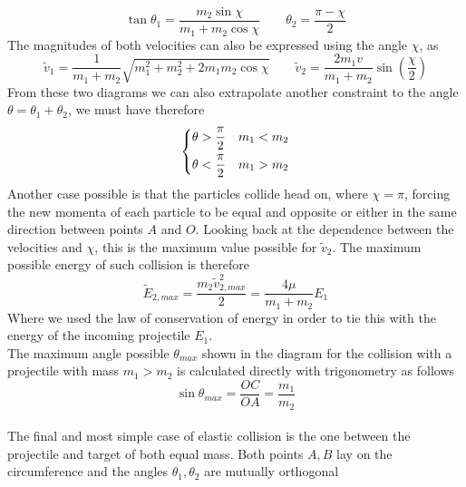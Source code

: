 \documentclass[../admech.tex]{subfiles}
\begin{document}
\begin{equation}
	\tan\theta_1=\frac{m_2\sin\chi}{m_1+m_2\cos\chi}\qquad\theta_2=\frac{\pi-\chi}{2}
	\label{eq:ecol12chi}
\end{equation}
The magnitudes of both velocities can also be expressed using the angle $\chi$, as
\begin{equation}
	\tilde{v}_1=\frac{1}{m_1+m_2}\sqrt{m_1^2+m_2^2+2m_1m_2\cos\chi}\qquad\tilde{v}_2=\frac{2m_1v}{m_1+m_2}\sin\left( \frac{\chi}{2} \right)
	\label{eq:ecolv12chi}
\end{equation}
From these two diagrams we can also extrapolate another constraint to the angle $\theta=\theta_1+\theta_2$, we must have therefore
\begin{equation}
	\begin{dcases}
		\theta>\frac{\pi}{2}&m_1<m_2\\
		\theta<\frac{\pi}{2}&m_1>m_2\\
	\end{dcases}
	\label{eq:thetaecol}
\end{equation}
Another case possible is that the particles collide head on, where $\chi=\pi$, forcing the new momenta of each particle to be equal and opposite or either in the same direction between points $A$ and $O$. Looking back at the dependence between the velocities and $\chi$, this is the maximum value possible for $\tilde{v}_2$. The maximum possible energy of such collision is therefore
\begin{equation}
	\tilde{E}_{2,max}=\frac{m_2\tilde{v}_{2,max}^2}{2}=\frac{4\mu}{m_1+m_2}E_1
	\label{eq:ecolE2max}
\end{equation}
Where we used the law of conservation of energy in order to tie this with the energy of the incoming projectile $E_1$.\\
The maximum angle possible $\theta_{max}$ shown in the diagram for the collision with a projectile with mass $m_1>m_2$ is calculated directly with trigonometry as follows
\begin{equation}
	\sin\theta_{max}=\frac{OC}{OA}=\frac{m_1}{m_2}
	\label{eq:thetamaxecol}
\end{equation}\\
The final and most simple case of elastic collision is the one between the projectile and target of both equal mass. Both points $A,B$ lay on the circumference and the angles $\theta_1,\theta_2$ are mutually orthogonal
\end{document}
